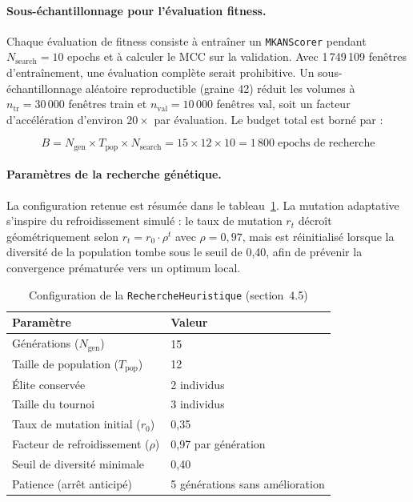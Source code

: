 \documentclass[11pt,a4paper,oneside]{report}
\theoremstyle{definition}
\theoremstyle{remark}
\begin{document}
\paragraph{Sous-échantillonnage pour l'évaluation fitness.}
Chaque évaluation de fitness consiste à entraîner un \texttt{MKANScorer} pendant $N_{\text{search}} = 10$ epochs et à calculer le MCC sur la validation. Avec 1\,749\,109 fenêtres d'entraînement, une évaluation complète serait prohibitive. Un sous-échantillonnage aléatoire reproductible (graine 42) réduit les volumes à $n_{\text{tr}} = 30\,000$ fenêtres train et $n_{\text{val}} = 10\,000$ fenêtres val, soit un facteur d'accélération d'environ $20\times$ par évaluation. Le budget total est borné par :

\begin{equation}
    B = N_{\text{gen}} \times T_{\text{pop}} \times N_{\text{search}}
      = 15 \times 12 \times 10 = 1\,800\;\text{epochs de recherche}
    \label{eq:budget}
\end{equation}

\paragraph{Paramètres de la recherche génétique.}
La configuration retenue est résumée dans le tableau~\ref{tab:rech_config}. La mutation adaptative s'inspire du refroidissement simulé \citep{haosol2024meta} : le taux de mutation $r_t$ décroît géométriquement selon $r_t = r_0 \cdot \rho^t$ avec $\rho = 0{,}97$, mais est réinitialisé lorsque la diversité de la population tombe sous le seuil de 0{,}40, afin de prévenir la convergence prématurée vers un optimum local.

\begin{table}[h!]
\centering
\caption{Configuration de la \texttt{RechercheHeuristique} (section~4.5)}
\label{tab:rech_config}
\begin{tabular}{ll}
\hline
\textbf{Paramètre} & \textbf{Valeur} \\
\hline
Générations ($N_{\text{gen}}$)      & 15 \\
Taille de population ($T_{\text{pop}}$) & 12 \\
Élite conservée                    & 2 individus \\
Taille du tournoi                  & 3 individus \\
Taux de mutation initial ($r_0$)   & 0{,}35 \\
Facteur de refroidissement ($\rho$) & 0{,}97 par génération \\
Seuil de diversité minimale        & 0{,}40 \\
Patience (arrêt anticipé)          & 5 générations sans amélioration \\
\hline
\end{tabular}
\end{table}
\end{document}
